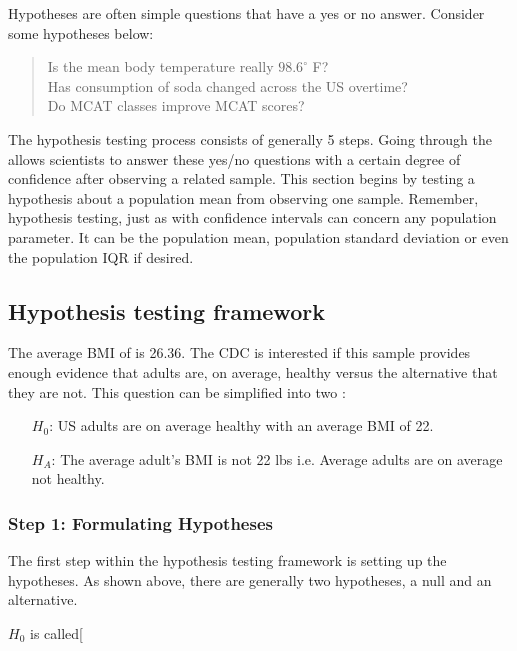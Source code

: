 Hypotheses are often simple questions that have a yes or no answer. Consider some hypotheses below: \begin{quote}
Is the mean body temperature really $98.6^\circ$ F? \\
Has consumption of soda changed across the US overtime? \\
Do MCAT classes improve MCAT scores? 
\end{quote}

The hypothesis testing process consists of generally 5 steps. Going through the  allows scientists to answer these yes/no questions with a certain degree of confidence after observing a related sample. This section begins by testing a hypothesis about a population mean from observing one sample. Remember, hypothesis testing, just as with confidence intervals can concern any population parameter. It can be the population mean, population standard deviation or even the population IQR if desired. 

\subsection{Hypothesis testing framework}
\label{hypothesisFramework}

The average BMI of  is 26.36. The CDC is interested if this sample provides enough evidence that adults are, on average, healthy versus the alternative that they are not. This question can be simplified into two : 
\begin{itemize}
\setlength{\itemsep}{0mm}
\item[$H_0$:] US adults are on average healthy with an average BMI of 22. 
\item[$H_A$:] The average adult's BMI is not 22 lbs i.e. Average adults are on average not healthy.
\end{itemize}

\subsubsection{Step 1: Formulating Hypotheses}

The first step within the hypothesis testing framework is setting up the hypotheses. As shown above, there are  generally two hypotheses, a null and an alternative. 

$H_0$ is called\marginpar[\raggedright\vspace{6mm}

